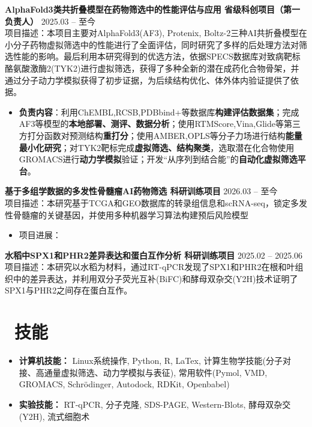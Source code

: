 \documentclass[11pt]{article}
\newlength{\interProjectSpacing}
\newcommand{\projectsep}{\vspace{\interProjectSpacing}}
\newlength{\intraProjectTitleSep}
\newcommand{\titlebreak}{\\[\intraProjectTitleSep]}
\newlength{\intraProjectListTopSep}
\begin{document}
\textbf{AlphaFold3类共折叠模型在药物筛选中的性能评估与应用 \quad 省级科创项目（第一负责人）} \hfill 2025.03 -- 至今 \titlebreak
项目描述：本项目主要对AlphaFold3(AF3), Protenix, Boltz-2三种AI共折叠模型在小分子药物虚拟筛选中的性能进行了全面评估，同时研究了多样的后处理方法对筛选性能的影响。最后利用本研究得到的优选方法，依据SPECS数据库对致病靶标酪氨酸激酶2(TYK2)进行虚拟筛选，获得了多种全新的潜在成药化合物骨架，并通过分子动力学模拟获得了初步证据，为后续结构优化、体外体内验证提供了依据。
\begin{itemize}%
    \item \textbf{负责内容}：利用ChEMBL,RCSB,PDBbind+等数据库\textbf{构建评估数据集}；完成AF3等模型的\textbf{本地部署、测评、数据分析}；使用RTMScore,Vina,Glide等第三方打分函数对预测结构\textbf{重打分}；使用AMBER,OPLS等分子力场进行结构\textbf{能量最小化研究}；对TYK2靶标完成\textbf{虚拟筛选、结构聚类}，选取潜在化合物使用GROMACS进行\textbf{动力学模拟}验证；开发“从序列到结合能”的\textbf{自动化虚拟筛选平台}。
\end{itemize}

\projectsep
\textbf{基于多组学数据的多发性骨髓瘤AI药物筛选 \quad 科研训练项目} \hfill 2026.03 -- 至今 \titlebreak
项目描述：本研究基于TCGA和GEO数据库的转录组信息和scRNA-seq，锁定多发性骨髓瘤的关键基因，并使用多种机器学习算法构建预后风险模型
\begin{itemize}
    \item 项目进展：
\end{itemize}
\projectsep

\textbf{水稻中SPX1和PHR2差异表达和蛋白互作分析 \quad 科研训练项目} \hfill 2025.02 -- 2025.06 \titlebreak
项目描述：本研究以水稻为材料，通过RT-qPCR发现了SPX1和PHR2在根和叶组织中的差异表达，并利用双分子荧光互补(BiFC)和酵母双杂交(Y2H)技术证明了SPX1与PHR2之间存在蛋白互作。


\section{\makebox[\widthof{\faCogs}][c]{\color{CVBlue}\faCogs}\ 技能}
\begin{itemize}[nosep]
    \item \textbf{计算机技能：} Linux系统操作, Python, R, LaTex, 计算生物学技能(分子对接、高通量虚拟筛选、动力学模拟与表征), 常用软件(Pymol, VMD, GROMACS, Schrödinger, Autodock, RDKit, Openbabel)
    \item \textbf{实验技能：} RT-qPCR, 分子克隆, SDS-PAGE, Western-Blots, 酵母双杂交(Y2H), 流式细胞术
\end{itemize}
\end{document}
